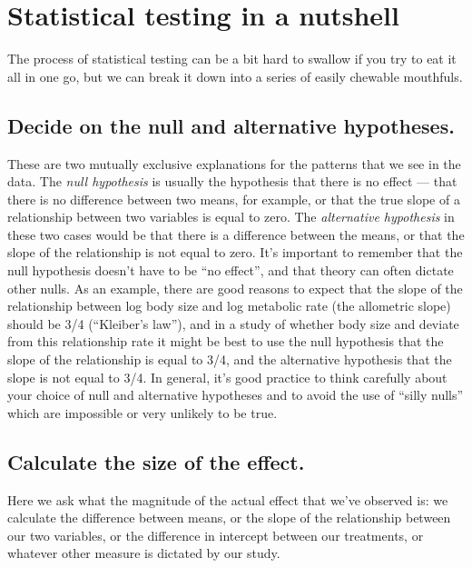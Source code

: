\documentclass[
]{book}
\begin{document}
\hypertarget{statistical-testing-in-a-nutshell}{%
\section{Statistical testing in a nutshell}\label{statistical-testing-in-a-nutshell}}

The process of statistical testing can be a bit hard to swallow if you try to eat it all in one go, but we can break it down into a series of easily chewable mouthfuls.

\hypertarget{decide-on-the-null-and-alternative-hypotheses.}{%
\subsection{Decide on the null and alternative hypotheses.}\label{decide-on-the-null-and-alternative-hypotheses.}}

These are two mutually exclusive explanations for the patterns that we see in the data. The \emph{null hypothesis} is usually the hypothesis that there is no effect --- that there is no difference between two means, for example, or that the true slope of a relationship between two variables is equal to zero. The \emph{alternative hypothesis} in these two cases would be that there is a difference between the means, or that the slope of the relationship is not equal to zero. It's important to remember that the null hypothesis doesn't have to be ``no effect'', and that theory can often dictate other nulls. As an example, there are good reasons to expect that the slope of the relationship between log body size and log metabolic rate (the allometric slope) should be 3/4 (``Kleiber's law''), and in a study of whether body size and deviate from this relationship rate it might be best to use the null hypothesis that the slope of the relationship is equal to 3/4, and the alternative hypothesis that the slope is not equal to 3/4. In general, it's good practice to think carefully about your choice of null and alternative hypotheses and to avoid the use of ``silly nulls'' which are impossible or very unlikely to be true.

\hypertarget{calculate-the-size-of-the-effect.}{%
\subsection{Calculate the size of the effect.}\label{calculate-the-size-of-the-effect.}}

Here we ask what the magnitude of the actual effect that we've observed is: we calculate the difference between means, or the slope of the relationship between our two variables, or the difference in intercept between our treatments, or whatever other measure is dictated by our study.
\end{document}
